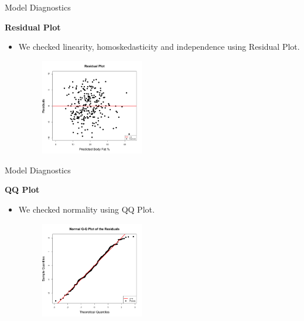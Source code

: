 \documentclass{beamer}
\begin{document}
\begin{frame}{Model Diagnostics}
\begin{flushleft}
\textbf{Residual Plot}
\end{flushleft}
\begin{itemize}
\item We checked linearity, homoskedasticity and independence using Residual Plot. 

\begin{figure}
   \includegraphics[width=0.425\textwidth]{../image/residual_plot.png}
\end{figure}
\end{itemize}


\end{frame}

\begin{frame}{Model Diagnostics}
\begin{flushleft}
\textbf{QQ Plot}
\end{flushleft}
\begin{itemize}
\item We checked normality using QQ Plot. 

\begin{figure}
   \includegraphics[width=0.425\textwidth]{../image/QQ_plot.png}
\end{figure}
\end{itemize}

\end{frame}
\end{document}

